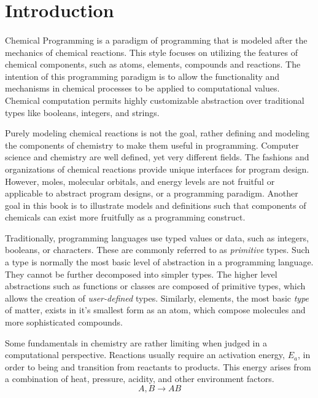 
\section{Introduction}

\paragraph{   } Chemical Programming is a paradigm of programming that is modeled after the mechanics of chemical reactions. This style focuses on utilizing the features of chemical components, such as atoms, elements, compounds and reactions. The intention of this programming paradigm is to allow the functionality and mechanisms in chemical processes to be applied to computational values. Chemical computation permits highly customizable abstraction over traditional types like booleans, integers, and strings.
\par Purely modeling chemical reactions is not the goal, rather defining and modeling the components of chemistry to make them useful in programming. Computer science and chemistry are well defined, yet very different fields. The fashions and organizations of chemical reactions provide unique interfaces for program design. However, moles, molecular orbitals, and energy levels are not fruitful or applicable to abstract program designs, or a programming paradigm. Another goal in this book is to illustrate models and definitions such that components of chemicals can exist more fruitfully as a programming construct. 

\par Traditionally, programming languages use typed values or data, such as integers, booleans, or characters. These are commonly referred to as \textit{primitive} types. Such a type is normally the most basic level of abstraction in a programming language. They cannot be further decomposed into simpler types. The higher level abstractions such as functions or classes are composed of primitive types, which allows the creation of \textit{user-defined} types. Similarly, elements, the most basic \textit{type} of matter, exists in it's smallest form as an atom, which compose molecules and more sophisticated compounds.

\par Some fundamentals in chemistry are rather limiting when judged in a computational perspective. Reactions usually require an activation energy, $E_a$, in order to being and transition from reactants to products. This energy arises from a combination of heat, pressure, acidity, and other environment factors. \break
\begin{equation}
A, B \longrightarrow AB
\end{equation}